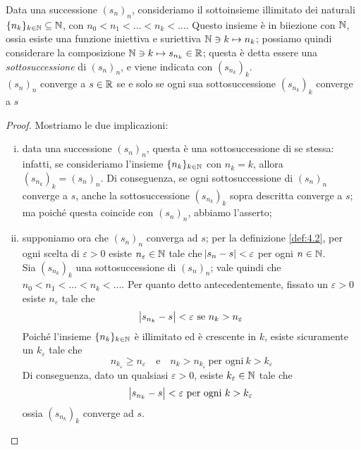 \begin{theorem}
    \label{th:4.1}
    Data una successione $(s_n)_n$, consideriamo il sottoinsieme illimitato dei naturali $\{n_k\}_{k\in\amsbb{N}}\subseteq \amsbb{N}$, con $n_0<n_1<\dots < n_k < \dots$. Questo insieme è in biiezione con $\amsbb{N}$, ossia esiste una funzione iniettiva e suriettiva $\amsbb{N}\ni k \mapsto n_k$; possiamo quindi considerare la composizione $\amsbb{N}\ni k \mapsto s_{n_k}\in\amsbb{R}$; questa è detta essere una \emph{sottosuccessione} di $(s_n)_n$, e viene indicata con $(s_{n_k})_k$.\\
    $(s_n)_n$ converge a $s\in\amsbb{R}$ se e solo se ogni sua sottosuccessione $(s_{n_k})_k$ converge a $s$ 
\end{theorem}
\begin{proof}
    Mostriamo le due implicazioni:
    \begin{enumerate}[(i)]
        \item data una successione $(s_n)_n$, questa è una sottosuccessione di se stessa: infatti, se consideriamo l'insieme $\{n_k\}_{k\in\amsbb{N}}$ con $n_k = k$, allora $(s_{n_k})_k = (s_n)_n$. Di conseguenza, se ogni sottosuccessione di $(s_n)_n$ converge a $s$, anche la sottosuccessione $(s_{n_k})_{k}$ sopra descritta converge a $s$; ma poiché questa coincide con $(s_n)_n$, abbiamo l'asserto;
        \item supponiamo ora che $(s_n)_n$ converga ad $s$; per la definizione \ref{def:4.2}, per ogni scelta di $\varepsilon>0$ esiste $n_\varepsilon\in\amsbb{N}$ tale che $\abs{s_n-s}<\varepsilon$ per ogni $n\in\amsbb{N}$.\\
        Sia $(s_{n_k})_k$ una sottosuccessione di $(s_n)_n$; vale quindi che $n_0 < n_1 < \dots < n_k < \dots$. Per quanto detto antecedentemente, fissato un $\varepsilon>0$ esiste $n_\varepsilon$ tale che
        \[
        \abs{s_{n_k} - s}<\varepsilon \ \text{se} \ n_k > n_\varepsilon
        \]
        Poiché l'insieme $\{n_k\}_{k\in\amsbb{N}}$ è illimitato ed è crescente in $k$, esiste sicuramente un $k_\varepsilon$ tale che
        \[
        n_{k_\varepsilon}\ge n_\varepsilon \quad \text{e} \quad n_k > n_{k_\varepsilon} \ \text{per ogni} \ k>k_\varepsilon
        \]
        Di conseguenza, dato un qualsiasi $\varepsilon>0$, esiste $k_\varepsilon\in\amsbb{N}$ tale che
        \[
        \abs{s_{n_k}-s}<\varepsilon \ \text{per ogni} \ k>k_\varepsilon
        \]
        ossia $(s_{n_k})_k$ converge ad $s$.
    \end{enumerate}
\end{proof}

